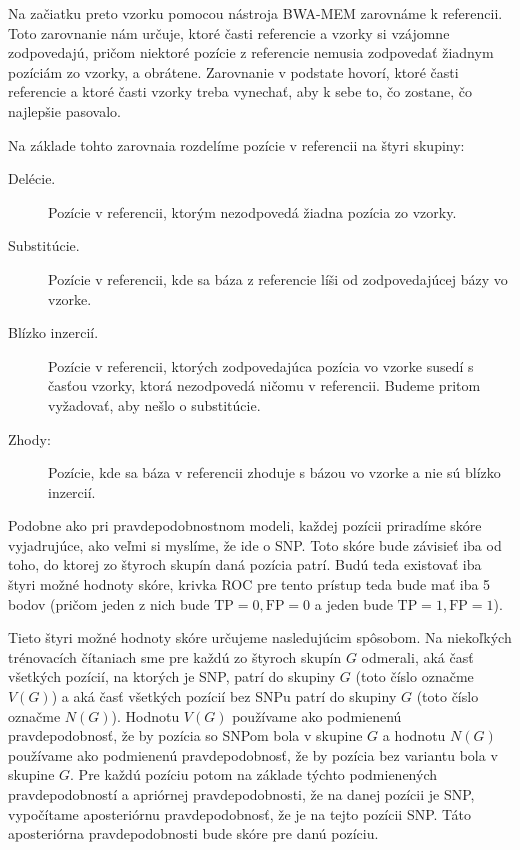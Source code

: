 Na začiatku preto vzorku pomocou nástroja BWA-MEM zarovnáme k referencii. 
Toto zarovnanie nám určuje, ktoré časti referencie a vzorky si vzájomne zodpovedajú, pričom
niektoré pozície z referencie nemusia zodpovedať žiadnym pozíciám zo vzorky, a obrátene. Zarovnanie v podstate hovorí, ktoré časti referencie 
a ktoré časti vzorky treba vynechať, aby k sebe to, čo zostane, čo najlepšie pasovalo. 


Na základe
tohto zarovnaia rozdelíme pozície v referencii na štyri skupiny:

\begin{description}

\item[Delécie.] Pozície v referencii, ktorým nezodpovedá žiadna pozícia zo vzorky.
\item[Substitúcie.] Pozície v referencii, kde sa báza z referencie líši od zodpovedajúcej
bázy vo vzorke.
\item[Blízko inzercií.] Pozície v referencii, ktorých zodpovedajúca pozícia vo vzorke susedí
s časťou vzorky, ktorá nezodpovedá ničomu v referencii. Budeme pritom vyžadovať, aby nešlo
o substitúcie.
\item[Zhody:] Pozície, kde sa báza v referencii zhoduje s bázou vo vzorke a nie sú blízko inzercií.

\end{description}

Podobne ako pri pravdepodobnostnom modeli, každej pozícii priradíme skóre vyjadrujúce,
ako veľmi si myslíme, že ide o SNP. Toto skóre bude závisieť iba od toho, do ktorej zo štyroch skupín
daná pozícia patrí. Budú teda existovať iba štyri možné hodnoty skóre, krivka ROC pre tento prístup
teda bude mať iba 5 bodov (pričom jeden z nich bude $\mathrm{TP} = 0, \mathrm{FP} = 0$ a
jeden bude $\mathrm{TP} = 1, \mathrm{FP} = 1$).

Tieto štyri možné hodnoty skóre určujeme nasledujúcim spôsobom. Na niekoľkých trénovacích čítaniach
sme pre každú zo štyroch skupín $G$ odmerali, aká časť všetkých pozícií, na ktorých je SNP, patrí do skupiny $G$ 
(toto číslo označme $V(G)$)
 a aká časť všetkých pozícií bez SNPu patrí do skupiny $G$ (toto číslo označme $N(G)$). 
Hodnotu $V(G)$ používame ako podmienenú pravdepodobnosť, že by pozícia so SNPom bola v skupine $G$
a hodnotu $N(G)$ používame ako podmienenú pravdepodobnosť, že by pozícia bez variantu bola v skupine 
$G$. Pre každú pozíciu potom na základe týchto podmienených pravdepodobností a apriórnej 
pravdepodobnosti, že na danej pozícii je SNP, vypočítame aposteriórnu pravdepodobnosť, že je na tejto
pozícii SNP. Táto aposteriórna pravdepodobnosti bude skóre pre danú pozíciu.

